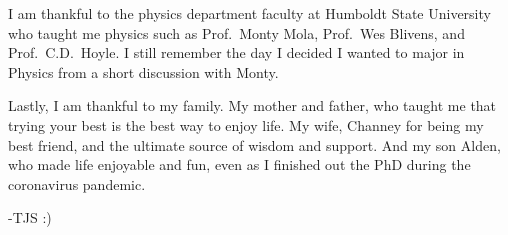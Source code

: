 \begin{acknowledgements}
    I am thankful to the physics department faculty at Humboldt State University who taught me physics such as Prof.\ Monty Mola, Prof.\ Wes Blivens, and Prof.\ C.D.\ Hoyle. I still remember the day I decided I wanted to major in Physics from a short discussion with Monty.

    Lastly, I am thankful to my family. My mother and father, who taught me that trying your best is the best way to enjoy life. My wife, Channey for being my best friend, and the ultimate source of wisdom and support. And my son Alden, who made life enjoyable and fun, even as I finished out the PhD during the coronavirus pandemic.


    \hfill -TJS :)
\end{acknowledgements}
